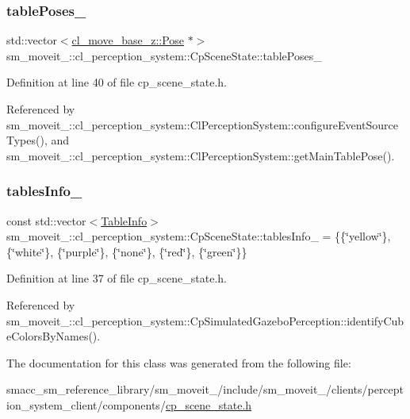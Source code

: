 \subsubsection{\texorpdfstring{table\+Poses\+\_\+}{tablePoses\_}}
{\footnotesize\ttfamily std\+::vector$<$\hyperlink{classcl__move__base__z_1_1Pose}{cl\+\_\+move\+\_\+base\+\_\+z\+::\+Pose} $\ast$$>$ sm\+\_\+moveit\+\_\+::cl\+\_\+perception\+\_\+system\+::\+Cp\+Scene\+State\+::table\+Poses\+\_\+}



Definition at line 40 of file cp\+\_\+scene\+\_\+state.\+h.



Referenced by sm\+\_\+moveit\+\_\+::cl\+\_\+perception\+\_\+system\+::\+Cl\+Perception\+System\+::configure\+Event\+Source\+Types(), and sm\+\_\+moveit\+\_\+::cl\+\_\+perception\+\_\+system\+::\+Cl\+Perception\+System\+::get\+Main\+Table\+Pose().

\mbox{\label{classsm__moveit__4_1_1cl__perception__system_1_1CpSceneState_ab579f3b2eaf29cfd239944f41693e6c3}} 
\subsubsection{\texorpdfstring{tables\+Info\+\_\+}{tablesInfo\_}}
{\footnotesize\ttfamily const std\+::vector$<$\hyperlink{structsm__moveit__4_1_1cl__perception__system_1_1TableInfo}{Table\+Info}$>$ sm\+\_\+moveit\+\_\+::cl\+\_\+perception\+\_\+system\+::\+Cp\+Scene\+State\+::tables\+Info\+\_\+ = \{\{\char`\"{}yellow\char`\"{}\}, \{\char`\"{}white\char`\"{}\}, \{\char`\"{}purple\char`\"{}\}, \{\char`\"{}none\char`\"{}\}, \{\char`\"{}red\char`\"{}\}, \{\char`\"{}green\char`\"{}\}\}}



Definition at line 37 of file cp\+\_\+scene\+\_\+state.\+h.



Referenced by sm\+\_\+moveit\+\_\+::cl\+\_\+perception\+\_\+system\+::\+Cp\+Simulated\+Gazebo\+Perception\+::identify\+Cube\+Colors\+By\+Names().



The documentation for this class was generated from the following file\+:\begin{DoxyCompactItemize}
\item 
smacc\+\_\+sm\+\_\+reference\+\_\+library/sm\+\_\+moveit\+\_/include/sm\+\_\+moveit\+\_/clients/perception\+\_\+system\+\_\+client/components/\hyperlink{cp__scene__state_8h}{cp\+\_\+scene\+\_\+state.\+h}\end{DoxyCompactItemize}
